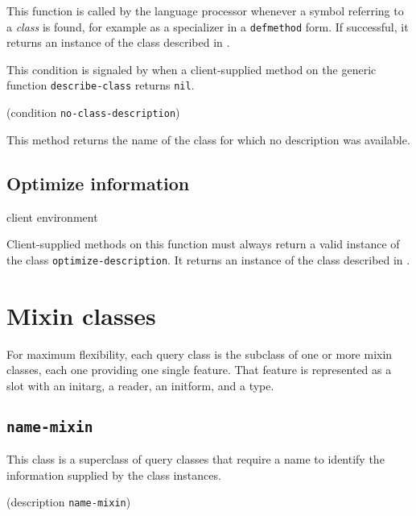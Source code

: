 This function is called by the language processor whenever a symbol
referring to a \emph{class} is found, for example as a specializer in
a \texttt{defmethod} form.  If successful, it returns an instance of
the class described in
.

{\footnotesize
{}
}

This condition is signaled by \sysname{} when a client-supplied method
on the generic function \texttt{describe-class} returns \texttt{nil}.

{\footnotesize
{} {(condition {\tt no-class-description})}
}

This method returns the name of the class for which no description was
available.

\subsection{Optimize information}

{\footnotesize
{} {client environment}
}

Client-supplied methods on this function must always return a valid
instance of the class \texttt{optimize-description}.  It returns an
instance of the class described in
.


\section{Mixin classes}

For maximum flexibility, each query class is the subclass of one or
more mixin classes, each one providing one single feature.  That
feature is represented as a slot with an initarg, a reader, an
initform, and a type.

\subsection{\texttt{name-mixin}}
\label{sec-name-mixin}

{\footnotesize
{}
}

This class is a superclass of query classes that require a name to
identify the information supplied by the class instances.

{\footnotesize
{}
}

{\footnotesize
{} {(description {\tt name-mixin})}
}

